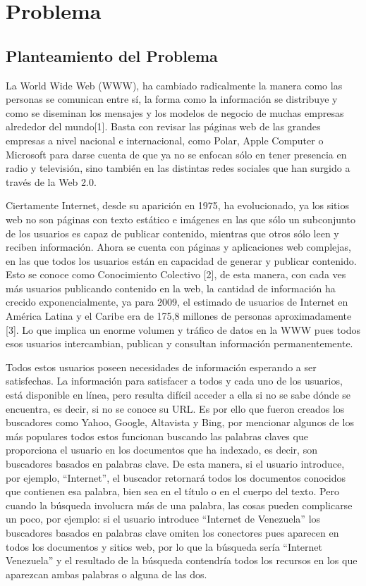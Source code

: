 \chapter{Problema}
\label{chap:problema}


\section{Planteamiento del Problema }

La World Wide Web (WWW), ha cambiado radicalmente la manera como las personas se comunican entre sí, la forma como la información se distribuye y como se diseminan los mensajes y los modelos de negocio de muchas empresas alrededor del mundo[1]. Basta con revisar las páginas web de las grandes empresas a nivel nacional e internacional, como Polar, Apple Computer o Microsoft para darse cuenta de que ya no se enfocan sólo en tener presencia en radio y televisión, sino también en las distintas redes sociales que han surgido a través de la Web 2.0.

Ciertamente Internet, desde su aparición en 1975, ha evolucionado, ya los sitios web no son páginas con texto estático e imágenes en las que sólo un subconjunto de los usuarios es capaz de publicar contenido, mientras que otros sólo leen y reciben información. Ahora se cuenta con páginas y aplicaciones web complejas, en las que todos los usuarios están en capacidad de generar y publicar contenido. Esto se conoce como Conocimiento Colectivo [2], de esta manera, con cada ves más usuarios publicando contenido en la web, la cantidad de información ha crecido exponencialmente, ya para 2009, el estimado de usuarios de Internet en América Latina y el Caribe era de 175,8 millones de personas aproximadamente [3]. Lo que implica un enorme volumen y tráfico de datos en la WWW pues todos esos usuarios intercambian, publican y consultan información permanentemente.

Todos estos usuarios poseen necesidades de información esperando a ser satisfechas. La información para satisfacer a todos y cada uno de los usuarios, está disponible en línea, pero resulta difícil acceder a ella si no se sabe dónde se encuentra, es decir, si no se conoce su URL. Es por ello que fueron creados los buscadores como Yahoo, Google, Altavista y Bing, por mencionar algunos de los más populares todos estos funcionan buscando las palabras claves que proporciona el usuario en los documentos que ha indexado, es decir, son buscadores basados en palabras clave. De esta manera, si el usuario introduce, por ejemplo, ``Internet”, el buscador retornará todos los documentos conocidos que contienen esa palabra, bien sea en el título o en el cuerpo del texto. Pero cuando la búsqueda involucra más de una palabra, las cosas pueden complicarse un poco, por ejemplo: si el usuario introduce ``Internet de Venezuela” los buscadores basados en palabras clave omiten los conectores pues aparecen en todos los documentos y sitios web, por lo que la búsqueda sería ``Internet Venezuela” y el resultado de la búsqueda contendría todos los recursos en los que aparezcan ambas palabras o alguna de las dos.

